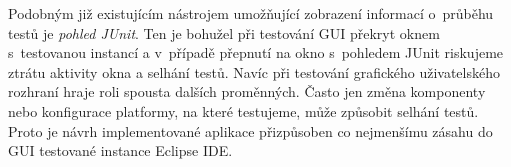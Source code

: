 Podobným již existujícím nástrojem umožňující zobrazení informací o~průběhu testů je \emph{pohled JUnit}. Ten je bohužel při testování GUI překryt oknem s~testovanou instancí a v~případě přepnutí na okno s~pohledem JUnit riskujeme ztrátu aktivity okna a selhání testů. Navíc při testování grafického uživatelského rozhraní hraje roli spousta dalších proměnných. Často jen změna komponenty nebo konfigurace platformy, na které testujeme, může způsobit selhání testů. Proto je návrh implementované aplikace přizpůsoben co nejmenšímu zásahu do GUI testované instance Eclipse IDE.
